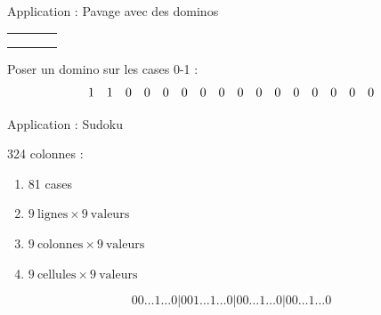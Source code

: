 \documentclass{beamer}
\begin{document}
\begin{frame}{Application : Pavage avec des dominos}

\begin{center}
  \begin{tabular}{|c|c|c|c|}
		\hline
   	\cellcolor{red} & \cellcolor{red} &  &  \\
		\hline
    	&  &  &  \\
		\hline
   	 &  &  &  \\
		\hline
   & &  &  \\
		\hline
\end{tabular}
\end{center}


Poser un domino sur les cases 0-1 :
\[
  \begin{array}{ c c c c c c c c c c c c c c c c }
	1 & 1 & 0 & 0 & 0 & 0 & 0 & 0 & 0 & 0 & 0 & 0 & 0 & 0 & 0 & 0 
  \end{array}
\]
\end{frame}



\begin{frame}{Application : Sudoku}

\begin{figure}[h]
\end{figure}

324 colonnes : 
\begin{enumerate}
\item 81 cases
\item $ 9~\textrm{lignes} \times 9~\textrm{valeurs}$ 
\item $ 9~\textrm{colonnes} \times 9~\textrm{valeurs}$ 
\item $ 9~\textrm{cellules} \times 9~\textrm{valeurs}$
\end{enumerate}

\[
	0 0 \dots 1 \dots 0 | 0 0 1\dots 1 \dots 0 |
	0 0 \dots 1 \dots 0 | 0 0 \dots 1 \dots 0 
\]


\end{frame}
\end{document}
